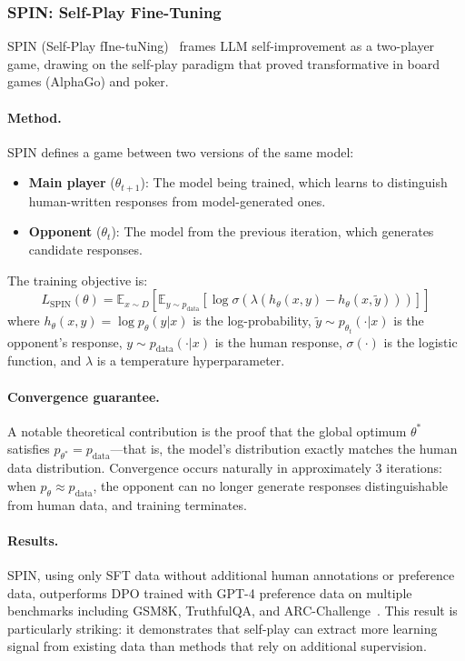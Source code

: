 \subsubsection{SPIN: Self-Play Fine-Tuning}
\label{sec:spin}

SPIN (Self-Play fIne-tuNing)~\citep{chen2024spin} frames LLM self-improvement as a two-player game, drawing on the self-play paradigm that proved transformative in board games (AlphaGo) and poker.

\paragraph{Method.}
SPIN defines a game between two versions of the same model:
\begin{itemize}
    \item \textbf{Main player} ($\theta_{t+1}$): The model being trained, which learns to distinguish human-written responses from model-generated ones.
    \item \textbf{Opponent} ($\theta_t$): The model from the previous iteration, which generates candidate responses.
\end{itemize}

The training objective is:
\begin{equation}
    L_{\text{SPIN}}(\theta) = \mathbb{E}_{x \sim D}\left[\mathbb{E}_{y \sim p_{\text{data}}}\left[\log \sigma\left(\lambda\left(h_\theta(x,y) - h_\theta(x,\tilde{y})\right)\right)\right]\right]
    \label{eq:spin}
\end{equation}
where $h_\theta(x,y) = \log p_\theta(y|x)$ is the log-probability, $\tilde{y} \sim p_{\theta_t}(\cdot|x)$ is the opponent's response, $y \sim p_{\text{data}}(\cdot|x)$ is the human response, $\sigma(\cdot)$ is the logistic function, and $\lambda$ is a temperature hyperparameter.

\paragraph{Convergence guarantee.}
A notable theoretical contribution is the proof that the global optimum $\theta^*$ satisfies $p_{\theta^*} = p_{\text{data}}$---that is, the model's distribution exactly matches the human data distribution. Convergence occurs naturally in approximately 3 iterations: when $p_\theta \approx p_{\text{data}}$, the opponent can no longer generate responses distinguishable from human data, and training terminates.

\paragraph{Results.}
SPIN, using only SFT data without additional human annotations or preference data, outperforms DPO trained with GPT-4 preference data on multiple benchmarks including GSM8K, TruthfulQA, and ARC-Challenge~\citep{chen2024spin}. This result is particularly striking: it demonstrates that self-play can extract more learning signal from existing data than methods that rely on additional supervision.

